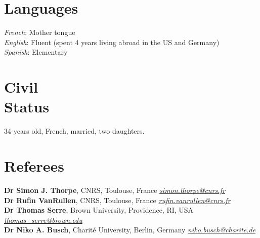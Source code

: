 \documentclass[margin,line]{resume}
\begin{document}
\begin{resume}


\vspace{3mm}
    \section{\mysidestyle Languages}
	\textsl{French}: Mother tongue\\
	\textsl{English}: Fluent (spent 4 years living abroad in the US and Germany)\\
	\textsl{Spanish}: Elementary

    \section{\mysidestyle Civil\\Status}
    34 years old, French, married, two daughters.	

\vspace{3mm}	
	\section{\mysidestyle Referees} 

	\textbf{Dr Simon J. Thorpe}, CNRS, Toulouse, France  \hfill \textsl{\href{mailto:simon.thorpe@cnrs.fr}{simon.thorpe@cnrs.fr}}\\
	\textbf{Dr Rufin VanRullen}, CNRS, Toulouse, France \hfill \textsl{\href{mailto:rufin.vanrullen@cnrs.fr}{rufin.vanrullen@cnrs.fr}} \\
	\textbf{Dr Thomas Serre}, Brown University, Providence, RI, USA \hfill \textsl{\href{mailto:thomas_serre@brown.edu}{thomas\_serre@brown.edu}} \\
	\textbf{Dr Niko A. Busch}, Charité University, Berlin, Germany \hfill \textsl{\href{mailto:niko.busch@charite.de}{niko.busch@charite.de}} \\


\end{resume}
\end{document}
